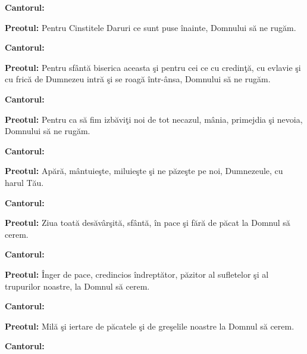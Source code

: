 \documentclass[11pt,letterpaper]{book} \usepackage{ucs}
\begin{document}
  {\bf Cantorul:}
  \begin{center}
  \end{center}

  {\bf Preotul:} Pentru Cinstitele Daruri ce sunt puse înainte,
  Domnului să ne rugăm.

  {\bf Cantorul:}
  \begin{center}
  \end{center}
  \pagebreak

  {\bf Preotul:} Pentru sfântă biserica aceasta şi pentru cei ce cu
  credinţă, cu evlavie şi cu frică de Dumnezeu intră şi se roagă
  într-ânsa, Domnului să ne rugăm.

  {\bf Cantorul:}
  \begin{center}
  \end{center}

  {\bf Preotul:} Pentru ca să fim izbăviţi noi de tot
  necazul, mânia, primejdia şi nevoia, Domnului să ne
  rugăm.

  {\bf Cantorul:}
  \begin{center}
  \end{center}
  \pagebreak

  {\bf Preotul:} Apără, mântuieşte, miluieşte şi ne păzeşte pe noi,
  Dumnezeule, cu harul Tău.

  {\bf Cantorul:}
  \begin{center}
  \end{center}

  {\bf Preotul:} Ziua toată desăvârşită, sfântă, în pace şi fără de
  păcat la Domnul să cerem.

  {\bf Cantorul:}
  \begin{center}
  \end{center}  

  {\bf Preotul:} Înger de pace, credincios îndreptător, păzitor al
  sufletelor şi al trupurilor noastre, la Domnul să cerem.

  {\bf Cantorul:}
  \begin{center}
  \end{center}  

  {\bf Preotul:} Milă şi iertare de păcatele şi de greşelile noastre
  la Domnul să cerem.

  {\bf Cantorul:}
  \begin{center}
  \end{center}  
\end{document}
